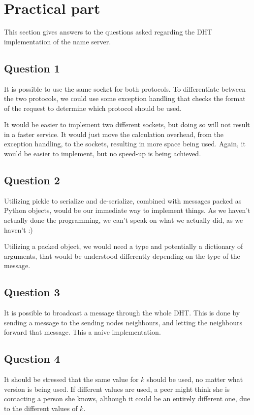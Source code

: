 \section{Practical part}
This section gives answers to the questions asked regarding the DHT
implementation of the name server.

\subsection{Question 1}
It is possible to use the same socket for both protocols. To
differentiate between the two protocols, we could use some exception
handling that checks the format of the request to determine which
protocol should be used.

It would be easier to implement two different sockets, but doing so
will not result in a faster service. It would just move the
calculation overhead, from the exception handling, to the sockets,
resulting in more space being used. Again, it would be easier to
implement, but no speed-up is being achieved.

\subsection{Question 2}
Utilizing pickle to serialize and de-serialize, combined with messages packed
as Python objects, would be our immediate way to implement things. As we
haven't actually done the programming, we can't speak on what we actually
did, as we haven't :)

Utilizing a packed object, we would need a type and potentially a dictionary
of arguments, that would be understood differently depending on the type of
the message.

\subsection{Question 3}
It is possible to broadcast a message through the whole DHT. This is
done by sending a message to the sending nodes neighbours, and letting
the neighbours forward that message. This a naive implementation.

\subsection{Question 4}
It should be stressed that the same value for $k$ should be used, no
matter what version is being used. If different values are used, a
peer might think she is contacting a person she knows, although it
could be an entirely different one, due to the different values of $k$.

